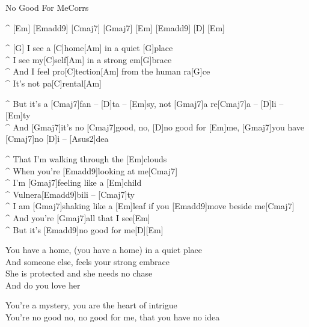 \begin{song}{No Good For Me}{Corrs}

\begin{guitar}
^ [Em] [Emadd9] [Cmaj7] [Gmaj7] [Em] [Emadd9] [D] [Em]\\
\end{guitar}

\begin{guitar}
^ [G]  I see a [C]home[Am] in a quiet [G]place\\
^ I see my[C]self[Am] in a strong em[G]brace\\
^ And I feel pro[C]tection[Am] from the human ra[G]ce\\
^ It's not pa[C]rental[Am]\\
\end{guitar}

\begin{guitar}
^ But it's a [Cmaj7]fan – [D]ta – [Em]sy, not [Gmaj7]a     re[Cmaj7]a –   [D]li – [Em]ty\\
^ And [Gmaj7]it's no [Cmaj7]good, no, [D]no good for [Em]me, [Gmaj7]you have [Cmaj7]no     [D]i – [Asus2]dea\\
\end{guitar}

\begin{guitar}
^ That I'm walking through the [Em]clouds\\
^ When you're [Emadd9]looking at me[Cmaj7]\\
^ I'm [Gmaj7]feeling like a [Em]child\\
^ Vulnera[Emadd9]bili –  [Cmaj7]ty\\
^ I am [Gmaj7]shaking like a [Em]leaf if you [Emadd9]move beside me[Cmaj7]\\
^ And you're [Gmaj7]all that I see[Em]\\
^ But it's [Emadd9]no good for me[D][Em]\\
\end{guitar}

\begin{guitar}
You have a home, (you have a home) in a quiet place\\
And someone else, feels your strong embrace\\
She is protected and she needs no chase\\
And do you love her\\
\end{guitar}

\begin{guitar}
You're a mystery, you are the heart of intrigue\\
You're no good no, no good for me, that you have no idea\\
\end{guitar}



\end{song}
